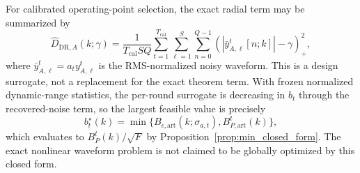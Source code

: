 \documentclass[journal]{IEEEtran}
\begin{document}
For calibrated operating-point selection, the exact radial term may be summarized by
\begin{equation}
    \widehat D_{\mathrm{DR},A}(k;\gamma)
    =\frac{1}{T_{\mathrm{cal}}SQ}
    \sum_{t=1}^{T_{\mathrm{cal}}}\sum_{\ell=1}^{S}\sum_{n=0}^{Q-1}
    \left(|\bar y_{A,\ell}^t[n;k]|-\gamma\right)_+^2,
\end{equation}
where $\bar y_{A,\ell}^t=a_ty_{A,\ell}^t$ is the RMS-normalized noisy waveform. This is a design surrogate, not a replacement for the exact theorem term. With frozen normalized dynamic-range statistics, the per-round surrogate is decreasing in $b_t$ through the recovered-noise term, so the largest feasible value is precisely
\begin{equation}
    b_t^\star(k)=\min\{B_{\epsilon,\mathrm{art}}(k;\sigma_{a,t}),B_{P,\mathrm{art}}^t(k)\},
\end{equation}
which evaluates to $B_P^t(k)/\sqrt F$ by Proposition~\ref{prop:min_closed_form}.
The exact nonlinear waveform problem is not claimed to be globally optimized by this closed form.
\end{document}
